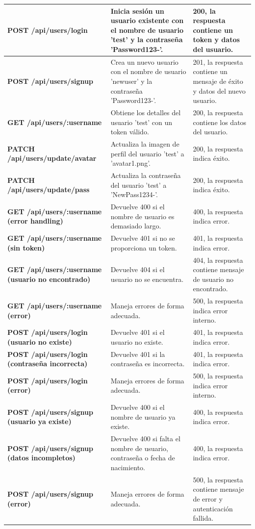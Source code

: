 \begin{longtable}{
    >{\columncolor{lightgreen!20}}p{4cm}
    p{6cm}
    p{4cm}
    }
    \midrule
    \textbf{POST /api/users/login} & Inicia sesión un usuario existente con el nombre de usuario 'test' y la contraseña 'Password123-'. & 200, la respuesta contiene un token y datos del usuario. \\
    \midrule
    \textbf{POST /api/users/signup} & Crea un nuevo usuario con el nombre de usuario 'newuser' y la contraseña 'Password123-'. & 201, la respuesta contiene un mensaje de éxito y datos del nuevo usuario. \\
    \midrule
    \textbf{GET /api/users/:username} & Obtiene los detalles del usuario 'test' con un token válido. & 200, la respuesta contiene los datos del usuario. \\
    \midrule
    \textbf{PATCH /api/users/update/avatar} & Actualiza la imagen de perfil del usuario 'test' a 'avatar1.png'. & 200, la respuesta indica éxito. \\
    \midrule
    \textbf{PATCH /api/users/update/pass} & Actualiza la contraseña del usuario 'test' a 'NewPass1234-'. & 200, la respuesta indica éxito. \\
    \midrule
    \textbf{GET /api/users/:username (error handling)} & Devuelve 400 si el nombre de usuario es demasiado largo. & 400, la respuesta indica error. \\
    \midrule
    \textbf{GET /api/users/:username (sin token)} & Devuelve 401 si no se proporciona un token. & 401, la respuesta indica error. \\
    \midrule
    \textbf{GET /api/users/:username (usuario no encontrado)} & Devuelve 404 si el usuario no se encuentra. & 404, la respuesta contiene mensaje de usuario no encontrado. \\
    \midrule
    \textbf{GET /api/users/:username (error)} & Maneja errores de forma adecuada. & 500, la respuesta indica error interno. \\
    \midrule
    \textbf{POST /api/users/login (usuario no existe)} & Devuelve 401 si el usuario no existe. & 401, la respuesta indica error. \\
    \midrule
    \textbf{POST /api/users/login (contraseña incorrecta)} & Devuelve 401 si la contraseña es incorrecta. & 401, la respuesta indica error. \\
    \midrule
    \textbf{POST /api/users/login (error)} & Maneja errores de forma adecuada. & 500, la respuesta indica error interno. \\
    \midrule
    \textbf{POST /api/users/signup (usuario ya existe)} & Devuelve 400 si el nombre de usuario ya existe. & 400, la respuesta indica error. \\
    \midrule
    \textbf{POST /api/users/signup (datos incompletos)} & Devuelve 400 si falta el nombre de usuario, contraseña o fecha de nacimiento. & 400, la respuesta indica error. \\
    \midrule
    \textbf{POST /api/users/signup (error)} & Maneja errores de forma adecuada. & 500, la respuesta contiene mensaje de error y autenticación fallida. \\
    \end{longtable}




